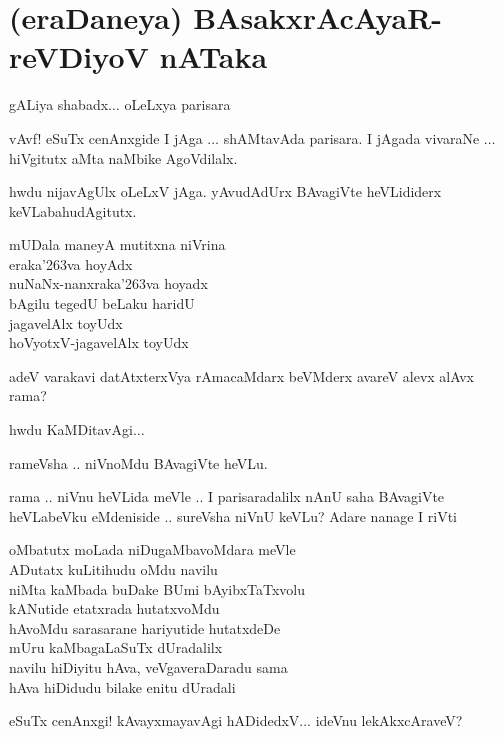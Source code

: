 \chapter[(eraDaneya) BAsakxrAcAyaR - reVDiyoV nATaka]{(eraDaneya) BAsakxrAcAyaR\break - reVDiyoV nATaka}

gALiya shabadx$\ldots$ oLeLxya parisara
\begin{description}
  \itemsep=1pt
\item[rameVsha:] vAvf! eSuTx cenAnxgide I jAga $\ldots$ shAMtavAda parisara. I jAgada vivaraNe $\ldots$ hiVgitutx aMta naMbike AgoVdilalx.

\item[sureVsha:] hwdu nijavAgUlx oLeLxV jAga. yAvudAdUrx BAvagiVte heVLididerx keVLabahudAgitutx.

\item[rameVsha:] mUDala maneyA mutitxna niVrina\\
eraka\char'263va hoyAdx\\
nuNaNx-nanxraka\char'263va hoyadx\\
bAgilu tegedU beLaku haridU\\
jagavelAlx toyUdx\\
hoVyotxV-jagavelAlx toyUdx

\item[rameVsha:] adeV varakavi datAtxterxVya rAmacaMdarx beVMderx avareV alevx alAvx rama?

\item[rama:] hwdu KaMDitavAgi$\ldots$

rameVsha .. niVnoMdu BAvagiVte heVLu.

\item[rameVsha:] rama .. niVnu heVLida meVle .. I parisaradalilx nAnU saha BAvagiVte heVLabeVku eMdeniside .. sureVsha niVnU keVLu? Adare nanage I riVti 

\smallskip
oMbatutx moLada niDugaMbavoMdara meVle\\
ADutatx kuLitihudu oMdu navilu\\
niMta kaMbada buDake BUmi bAyibxTaTxvolu\\
kANutide etatxrada hutatxvoMdu\\
hAvoMdu sarasarane hariyutide hutatxdeDe\\
mUru kaMbagaLaSuTx dUradalilx\\
navilu hiDiyitu hAva, veVgaveraDaradu sama\\
hAva hiDidudu bilake enitu dUradali
\smallskip

\item[rama:] eSuTx cenAnxgi! kAvayxmayavAgi hADidedxV... ideVnu lekAkxcAraveV?


\end{description}
